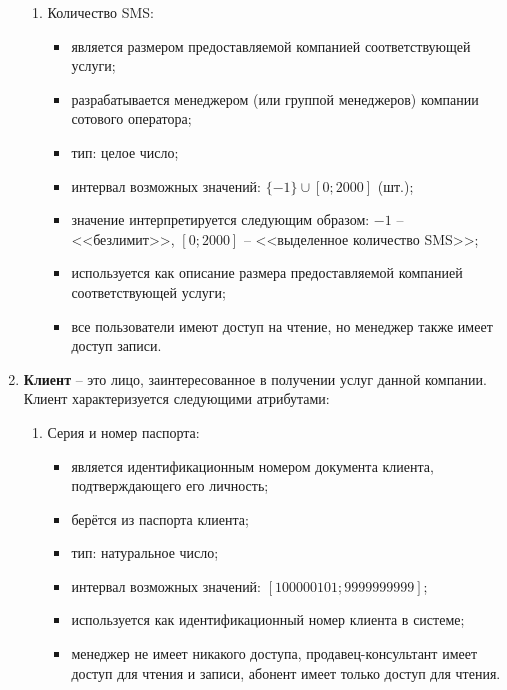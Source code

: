 \begin{enumerate}
\begin{enumerate}
        \item Количество SMS:
        \begin{itemize}
            \item является размером предоставляемой компанией соответствующей услуги;
            \item разрабатывается менеджером (или группой менеджеров) компании сотового оператора;
            \item тип: целое число;
            \item интервал возможных значений: $\{-1\} \cup [0; 2 000]$ (шт.); %
            \item значение интерпретируется следующим образом: $-1$ -- <<безлимит>>, $[0; 2 000]$ -- <<выделенное количество SMS>>;
            \item используется как описание размера предоставляемой компанией соответствующей услуги;
            \item все пользователи имеют доступ на чтение, но менеджер также имеет доступ записи.
        \end{itemize}
    \end{enumerate}


    \item \textbf{Клиент} -- это лицо, заинтересованное в получении услуг данной компании. Клиент характеризуется следующими атрибутами:
    \begin{enumerate}
        \item Серия и номер паспорта:
        \begin{itemize}
            \item является идентификационным номером документа клиента, подтверждающего его личность;
            \item берётся из паспорта клиента;
            \item тип: натуральное число;
            \item интервал возможных значений: $[100 000 101; 9 999 999 999]$;
            \item используется как идентификационный номер клиента в системе;
            \item менеджер не имеет никакого доступа, продавец-консультант имеет доступ для чтения и записи, абонент имеет только доступ для чтения.
        \end{itemize}


\end{enumerate}
\end{enumerate}
